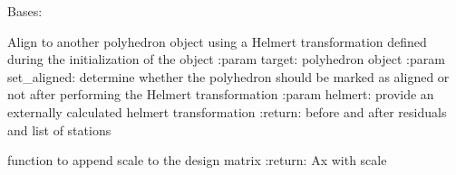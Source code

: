 \documentclass[letterpaper,10pt,english]{sphinxmanual}
\begin{document}
\begin{fulllineitems}
\label{\detokenize{pgamit.classes:pgamit.classes.pyStack.Polyhedron}}
\pysigstartsignatures
\pysiglinewithargsret
{}
{\sphinxparamcomma {}\sphinxparamcomma {}\sphinxparamcomma {}\sphinxparamcomma {}}
{}
\pysigstopsignatures
\sphinxAtStartPar
Bases: 

\begin{fulllineitems}
\label{\detokenize{pgamit.classes:pgamit.classes.pyStack.Polyhedron.align}}
\pysigstartsignatures
\pysiglinewithargsret
{}
{\sphinxparamcomma {}\sphinxparamcomma {}\sphinxparamcomma {}\sphinxparamcomma {}}
{}
\pysigstopsignatures
\sphinxAtStartPar
Align to another polyhedron object using a Helmert transformation defined
during the initialization of the object
:param target: polyhedron object
:param set\_aligned: determine whether the polyhedron should be marked as aligned or not after performing the
Helmert transformation
:param helmert: provide an externally calculated helmert transformation
:return: before and after residuals and list of stations

\end{fulllineitems}


\begin{fulllineitems}
\label{\detokenize{pgamit.classes:pgamit.classes.pyStack.Polyhedron.ax}}
\pysigstartsignatures
\pysiglinewithargsret
{}
{}
{}
\pysigstopsignatures
\sphinxAtStartPar
function to append scale to the design matrix
:return: Ax with scale


\end{fulllineitems}
\end{fulllineitems}
\end{document}
